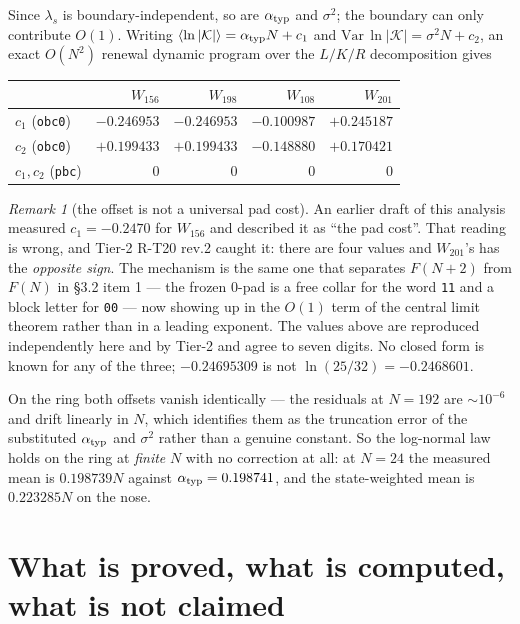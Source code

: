 \documentclass[11pt]{article}
\newcommand{\rt}[1]{\texttt{#1}}
\newcommand{\K}{\mathcal{K}}
\theoremstyle{plain}
\theoremstyle{remark}
\newtheorem{remark}{Remark}
\begin{document}
Since $\lambda_s$ is boundary-independent, so are $\alpha_{\rm typ}$ and
$\sigma^2$; the boundary can only contribute $O(1)$. Writing
$\langle\ln|\K|\rangle = \alpha_{\rm typ}N + c_1$ and
$\mathrm{Var}\,\ln|\K| = \sigma^2 N + c_2$, an exact $O(N^2)$ renewal dynamic
program over the $L/K/R$ decomposition gives
\begin{center}
\small
\begin{tabular}{lrrrr}
\toprule
& $W_{156}$ & $W_{198}$ & $W_{108}$ & $W_{201}$\\
\midrule
$c_1$ (\rt{obc0}) & $-0.246953$ & $-0.246953$ & $-0.100987$ & $+0.245187$\\
$c_2$ (\rt{obc0}) & $+0.199433$ & $+0.199433$ & $-0.148880$ & $+0.170421$\\
$c_1,c_2$ (\rt{pbc}) & $0$ & $0$ & $0$ & $0$\\
\bottomrule
\end{tabular}
\end{center}

\begin{remark}[the offset is not a universal pad cost]
An earlier draft of this analysis measured $c_1=-0.2470$ for $W_{156}$ and
described it as ``the pad cost''. That reading is wrong, and Tier-2 R-T20 rev.2
caught it: there are four values and $W_{201}$'s has the \emph{opposite sign}.
The mechanism is the same one that separates $F(N+2)$ from $F(N)$ in \S3.2 item
1 --- the frozen $0$-pad is a free collar for the word \rt{11} and a block letter
for \rt{00} --- now showing up in the $O(1)$ term of the central limit theorem
rather than in a leading exponent. The values above are reproduced independently
here and by Tier-2 and agree to seven digits. No closed form is known for any of
the three; $-0.24695309$ is not $\ln(25/32)=-0.2468601$.
\end{remark}

\noindent On the ring both offsets vanish identically --- the residuals at
$N=192$ are $\sim10^{-6}$ and drift linearly in $N$, which identifies them as the
truncation error of the substituted $\alpha_{\rm typ}$ and $\sigma^2$ rather than
a genuine constant. So the log-normal law holds on the ring at \emph{finite} $N$
with no correction at all: at $N=24$ the measured mean is $0.198739N$ against
$\alpha_{\rm typ}=0.198741$, and the state-weighted mean is $0.223285N$ on the
nose.

\section{What is proved, what is computed, what is not claimed}
\end{document}
